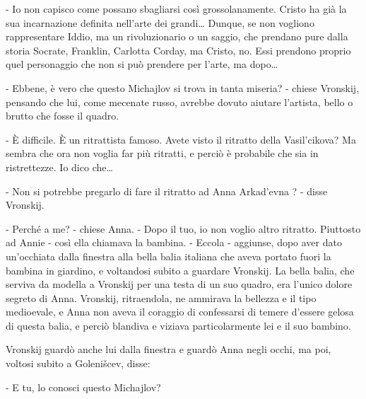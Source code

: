 - Io non capisco come possano sbagliarsi così grossolanamente. Cristo ha già la sua incarnazione definita nell'arte dei grandi\ldots{} Dunque, se non vogliono rappresentare Iddio, ma un rivoluzionario o un saggio, che prendano pure dalla storia Socrate, Franklin, Carlotta Corday, ma Cristo, no. Essi prendono proprio quel personaggio che non si può prendere per l'arte, ma dopo\ldots{} 

- Ebbene, è vero che questo Michajlov si trova in tanta miseria? - chiese Vronskij, pensando che lui, come mecenate russo, avrebbe dovuto aiutare l'artista, bello o brutto che fosse il quadro. 

- È difficile. È un ritrattista famoso. Avete visto il ritratto della Vasil'cikova? Ma sembra che ora non voglia far più ritratti, e perciò è probabile che sia in ristrettezze. Io dico che\ldots{} 

- Non si potrebbe pregarlo di fare il ritratto ad Anna Arkad'evna ? - disse Vronskij. 

- Perché a me? - chiese Anna. - Dopo il tuo, io non voglio altro ritratto. Piuttosto ad Annie - così ella chiamava la bambina. - Eccola - aggiunse, dopo aver dato un'occhiata dalla finestra alla bella balia italiana che aveva portato fuori la bambina in giardino, e voltandosi subito a guardare Vronskij. La bella balia, che serviva da modella a Vronskij per una testa di un suo quadro, era l'unico dolore segreto di Anna. Vronskij, ritraendola, ne ammirava la bellezza e il tipo medioevale, e Anna non aveva il coraggio di confessarsi di temere d'essere gelosa di questa balia, e perciò blandiva e viziava particolarmente lei e il suo bambino. 

Vronskij guardò anche lui dalla finestra e guardò Anna negli occhi, ma poi, voltosi subito a Golenišcev, disse: 

- E tu, lo conosci questo Michajlov? 

